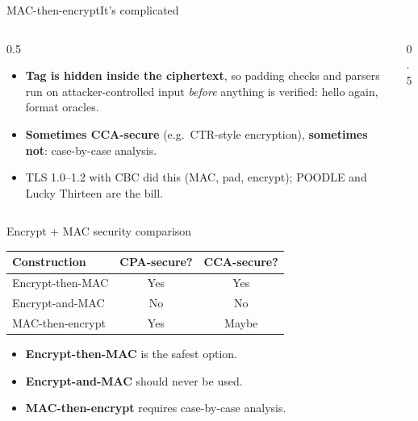 \ifdefined\PRESENTATION\else\PassOptionsToClass{handout}{beamer}\fi\documentclass[aspectratio=169, lualatex]{beamer}
\begin{document}
\begin{frame}{MAC-then-encrypt}{It's complicated}
	\begin{columns}[c]
		\begin{column}{0.5\textwidth}
			\begin{itemize}
				\item \textbf{Tag is hidden inside the ciphertext}, so padding checks and parsers run on attacker-controlled input \emph{before} anything is verified: hello again, format oracles.
				\item \textbf{Sometimes CCA-secure} (e.g.\ CTR-style encryption), \textbf{sometimes not}: case-by-case analysis.
				\item TLS 1.0--1.2 with CBC did this (MAC, pad, encrypt); POODLE and Lucky Thirteen are the bill.
			\end{itemize}
		\end{column}
		\begin{column}{0.5\textwidth}
		\end{column}
	\end{columns}
\end{frame}

\begin{frame}{Encrypt + MAC security comparison}
	\begin{center}
		\begin{tabular}{|l|c|c|}
			\hline
			\textbf{Construction} & \textbf{CPA-secure?} & \textbf{CCA-secure?} \\
			\hline
			Encrypt-then-MAC      & Yes                  & Yes                  \\
			\hline
			Encrypt-and-MAC       & No                   & No                   \\
			\hline
			MAC-then-encrypt      & Yes                  & Maybe                \\
			\hline
		\end{tabular}
	\end{center}
	\vspace{1em}
	\begin{itemize}
		\item \textbf{Encrypt-then-MAC} is the safest option.
		\item \textbf{Encrypt-and-MAC} should never be used.
		\item \textbf{MAC-then-encrypt} requires case-by-case analysis.
	\end{itemize}
\end{frame}
\end{document}
